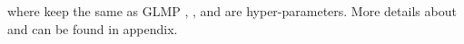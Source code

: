 \documentclass[11pt,a4paper]{article}
\begin{document}
where  keep the same as GLMP \cite{DBLP:conf/iclr/WuSX19}, ,  and  are hyper-parameters.
 More details about  and  can be found in appendix.
\begin{table}[t]
	\begin{center}
		
	\end{center}
	\caption{Statistics of datasets.}
	\label{tab:OverallSta}
\end{table}
\end{document}
